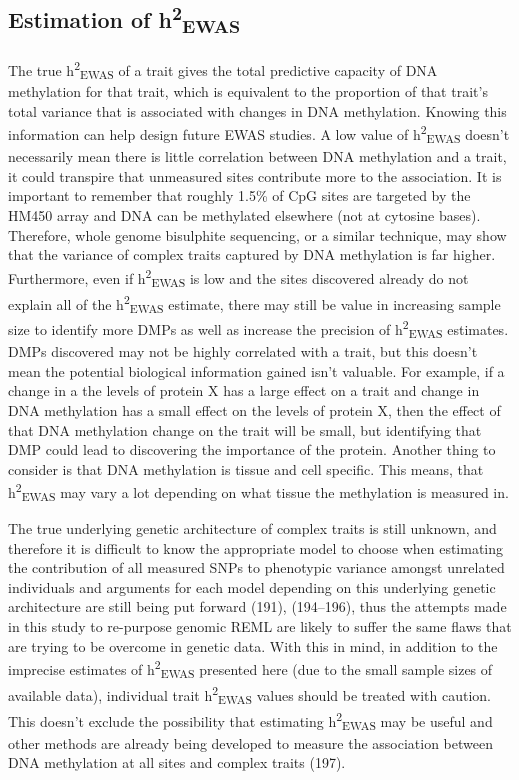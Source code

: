 \documentclass[11pt,twoside]{bristolthesis}
\begin{document}
\hypertarget{estimation-of-h2ewas}{%
\subsection{\texorpdfstring{Estimation of h\textsuperscript{2}\textsubscript{EWAS}}{Estimation of h2EWAS}}\label{estimation-of-h2ewas}}

The true h\textsuperscript{2}\textsubscript{EWAS} of a trait gives the total predictive capacity of DNA methylation for that trait, which is equivalent to the proportion of that trait's total variance that is associated with changes in DNA methylation. Knowing this information can help design future EWAS studies. A low value of h\textsuperscript{2}\textsubscript{EWAS} doesn't necessarily mean there is little correlation between DNA methylation and a trait, it could transpire that unmeasured sites contribute more to the association. It is important to remember that roughly 1.5\% of CpG sites are targeted by the HM450 array and DNA can be methylated elsewhere (not at cytosine bases). Therefore, whole genome bisulphite sequencing, or a similar technique, may show that the variance of complex traits captured by DNA methylation is far higher. Furthermore, even if h\textsuperscript{2}\textsubscript{EWAS} is low and the sites discovered already do not explain all of the h\textsuperscript{2}\textsubscript{EWAS} estimate, there may still be value in increasing sample size to identify more DMPs as well as increase the precision of h\textsuperscript{2}\textsubscript{EWAS} estimates. DMPs discovered may not be highly correlated with a trait, but this doesn't mean the potential biological information gained isn't valuable. For example, if a change in a the levels of protein X has a large effect on a trait and change in DNA methylation has a small effect on the levels of protein X, then the effect of that DNA methylation change on the trait will be small, but identifying that DMP could lead to discovering the importance of the protein. Another thing to consider is that DNA methylation is tissue and cell specific. This means, that h\textsuperscript{2}\textsubscript{EWAS} may vary a lot depending on what tissue the methylation is measured in.

The true underlying genetic architecture of complex traits is still unknown, and therefore it is difficult to know the appropriate model to choose when estimating the contribution of all measured SNPs to phenotypic variance amongst unrelated individuals and arguments for each model depending on this underlying genetic architecture are still being put forward (191), (194--196), thus the attempts made in this study to re-purpose genomic REML are likely to suffer the same flaws that are trying to be overcome in genetic data. With this in mind, in addition to the imprecise estimates of h\textsuperscript{2}\textsubscript{EWAS} presented here (due to the small sample sizes of available data), individual trait h\textsuperscript{2}\textsubscript{EWAS} values should be treated with caution. This doesn't exclude the possibility that estimating h\textsuperscript{2}\textsubscript{EWAS} may be useful and other methods are already being developed to measure the association between DNA methylation at all sites and complex traits (197).
\end{document}
